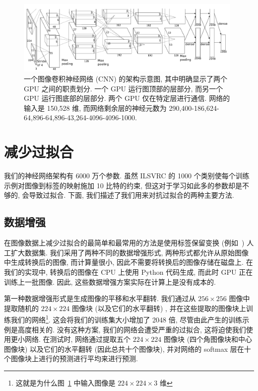 \documentclass{article} %
\begin{document}
\begin{figure}
\centering
\includegraphics[width=0.98\textwidth]{alexnet.png}
\caption{一个图像卷积神经网络 (CNN) 的架构示意图, 其中明确显示了两个 GPU 之间的职责划分. 一个 GPU 运行图顶部的层部分, 而另一个 GPU 运行图底部的层部分. 两个 GPU 仅在特定层进行通信. 网络的输入是 150,528 维, 而网络剩余层的神经元数为 290,400-186,624-64,896-64,896-43,264-4096-4096-1000.}
\label{fig:alexnet}
\end{figure}

\vspace{-1mm}
\section{减少过拟合}
\label{sec:overfit}
\vspace{-2ex}
我们的神经网络架构有 6000 万个参数. 虽然 ILSVRC 的 1000 个类别使每个训练示例对图像到标签的映射施加 10 比特的约束, 但这对于学习如此多的参数却是不够的, 会导致过拟合. 下面, 我们描述了我们用来对抗过拟合的两种主要方法.

\vspace{-1mm}
\subsection{数据增强}
\label{subsec:augment}
\vspace{-2ex}
在图像数据上减少过拟合的最简单和最常用的方法是使用标签保留变换 (例如~\cite{simard2003, cire2012, cire2011}) 人工扩大数据集. 我们采用了两种不同的数据增强形式, 两种形式都允许从原始图像中生成转换后的图像, 而计算量很小, 因此不需要将转换后的图像存储在磁盘上. 在我们的实现中, 转换后的图像在 CPU 上使用 Python 代码生成, 而此时 GPU 正在训练上一批图像. 因此, 这些数据增强方案实际在计算上是没有成本的.

第一种数据增强形式是生成图像的平移和水平翻转. 我们通过从 $256 \times 256$ 图像中提取随机的 $224 \times 224$ 图像块 (以及它们的水平翻转) , 并在这些提取的图像块上训练我们的网络\footnote{这就是为什么图~\ref{fig:alexnet} 中输入图像是 $224 \times 224 \times 3$ 维}. 这会将我们的训练集大小增加了 2048 倍, 尽管由此产生的训练示例是高度相关的. 没有这种方案, 我们的网络会遭受严重的过拟合, 这将迫使我们使用更小网络. 在测试时, 网络通过提取五个 $224 \times 224$ 图像块 (四个角图像块和中心图像块) 以及它们的水平翻转 (因此总共十个图像块), 并对网络的 softmax 层在十个图像块上进行的预测进行平均来进行预测.
\end{document}
